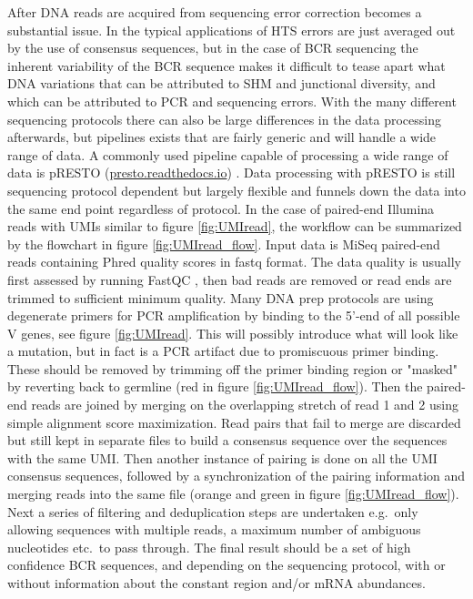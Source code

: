After DNA reads are acquired from sequencing error correction becomes a substantial issue.
In the typical applications of HTS errors are just averaged out by the use of consensus sequences, but in the case of BCR sequencing the inherent variability of the BCR sequence makes it difficult to tease apart what DNA variations that can be attributed to SHM and junctional diversity, and which can be attributed to PCR and sequencing errors.
With the many different sequencing protocols there can also be large differences in the data processing afterwards, but pipelines exists that are fairly generic and will handle a wide range of data.
A commonly used pipeline capable of processing a wide range of data is pRESTO (\url{presto.readthedocs.io}) \cite{vander2014presto}.
Data processing with pRESTO is still sequencing protocol dependent but largely flexible and funnels down the data into the same end point regardless of protocol.
In the case of paired-end Illumina reads with UMIs similar to figure \ref{fig:UMIread}, the workflow can be summarized by the flowchart in figure \ref{fig:UMIread_flow}.
Input data is MiSeq paired-end reads containing Phred quality scores in fastq format.
The data quality is usually first assessed by running FastQC \cite{andrews2010fastqc}, then bad reads are removed or read ends are trimmed to sufficient minimum quality.
Many DNA prep protocols are using degenerate primers for PCR amplification by binding to the 5'-end of all possible V genes, see figure \ref{fig:UMIread}.
This will possibly introduce what will look like a mutation, but in fact is a PCR artifact due to promiscuous primer binding.
These should be removed by trimming off the primer binding region or "masked" by reverting back to germline (red in figure \ref{fig:UMIread_flow}).
Then the paired-end reads are joined by merging on the overlapping stretch of read 1 and 2 using simple alignment score maximization.
Read pairs that fail to merge are discarded but still kept in separate files to build a consensus sequence over the sequences with the same UMI.
Then another instance of pairing is done on all the UMI consensus sequences, followed by a synchronization of the pairing information and merging reads into the same file (orange and green in figure \ref{fig:UMIread_flow}).
Next a series of filtering and deduplication steps are undertaken e.g.\ only allowing sequences with multiple reads, a maximum number of ambiguous nucleotides etc.\ to pass through.
The final result should be a set of high confidence BCR sequences, and depending on the sequencing protocol, with or without information about the constant region and/or mRNA abundances.

